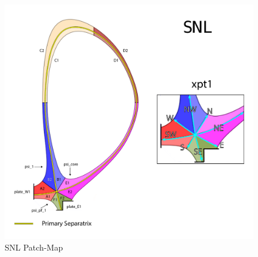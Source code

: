 \begin{figure}[H]
    \centering
        \includegraphics[width=\textwidth]{figures/configurations/SNL_collection.pdf}
        \caption{SNL Patch-Map}
        \label{fig:snl_patch_map}
\end{figure}

